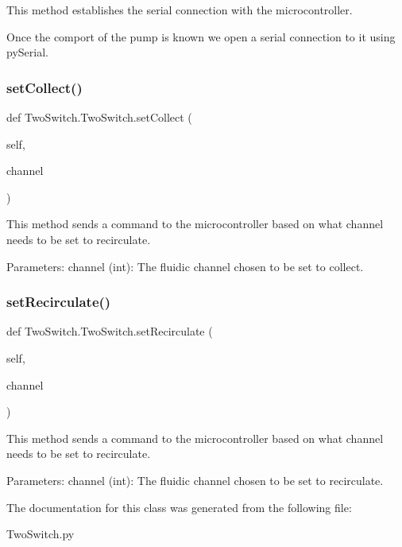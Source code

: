 \begin{DoxyVerb}This method establishes the serial connection with the microcontroller.

Once the comport of the pump is known we open a serial connection to it using pySerial.
\end{DoxyVerb}
 \mbox{\label{class_two_switch_1_1_two_switch_a755481c98e9abd57c5307217df83795b}} 
\subsubsection{\texorpdfstring{setCollect()}{setCollect()}}
{\footnotesize\ttfamily def Two\+Switch.\+Two\+Switch.\+set\+Collect (\begin{DoxyParamCaption}\item[{}]{self,  }\item[{}]{channel }\end{DoxyParamCaption})}

\begin{DoxyVerb}This method sends a command to the microcontroller based on what channel needs to be set to recirculate.

Parameters:
    channel (int): The fluidic channel chosen to be set to collect.
\end{DoxyVerb}
 \mbox{\label{class_two_switch_1_1_two_switch_a9c0f7d8f4a2af542cf574c11a9cee709}} 
\subsubsection{\texorpdfstring{setRecirculate()}{setRecirculate()}}
{\footnotesize\ttfamily def Two\+Switch.\+Two\+Switch.\+set\+Recirculate (\begin{DoxyParamCaption}\item[{}]{self,  }\item[{}]{channel }\end{DoxyParamCaption})}

\begin{DoxyVerb}This method sends a command to the microcontroller based on what channel needs to be set to recirculate.

Parameters:
    channel (int): The fluidic channel chosen to be set to recirculate.
\end{DoxyVerb}
 

The documentation for this class was generated from the following file\+:\begin{DoxyCompactItemize}
\item 
Two\+Switch.\+py\end{DoxyCompactItemize}
